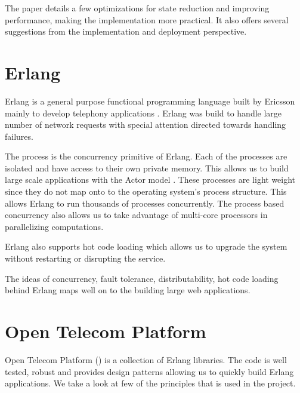 The paper details a few optimizations for state reduction and improving
performance, making the implementation more practical. It also offers
several suggestions from the implementation and deployment perspective.

\section{Erlang}

Erlang \citep{erlang} is a general purpose functional
programming language built by Ericsson mainly to develop telephony applications
\citep{Armstrong07}. Erlang was build to handle large number of network
requests with special attention directed towards handling failures.

The process is the concurrency primitive of Erlang. Each of the processes are
isolated and have access to their own private memory. This allows us to build
large scale applications with the Actor model%
\citep{Clinger81}. These processes are light weight since they do not map onto
to the operating system's process structure. This allows Erlang to run
thousands of processes concurrently. The process based concurrency also allows
us to take advantage of multi-core processors in parallelizing computations.

Erlang also supports hot code loading%
which allows us to upgrade the system
without restarting or disrupting the service.

The ideas of concurrency, fault tolerance, distributability, hot code loading
behind Erlang maps well on to the building large web applications.

\section{Open Telecom Platform}
\label{section:concepts.otp}

Open Telecom Platform () is a collection of Erlang libraries.
The  code is
well tested, robust and provides design patterns allowing us to quickly build
Erlang applications. We take a look at few of the  principles 
that is used in the project.

